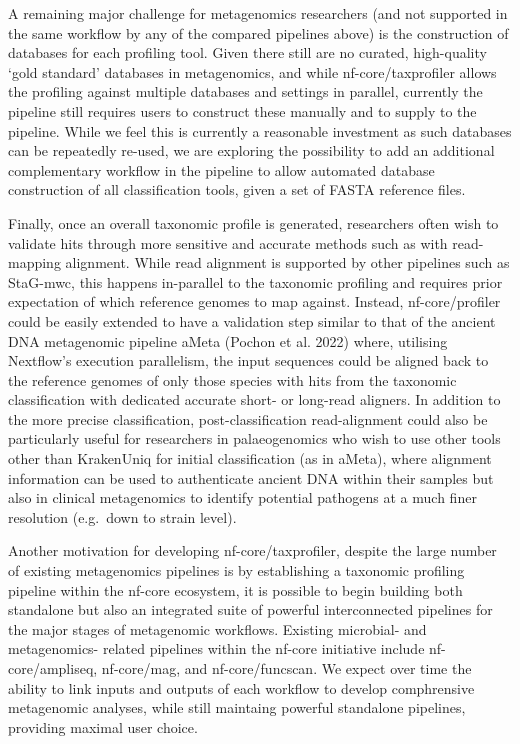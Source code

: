 \documentclass[
]{article}
\begin{document}
A remaining major challenge for metagenomics researchers (and not
supported in the same workflow by any of the compared pipelines above)
is the construction of databases for each profiling tool. Given there
still are no curated, high-quality `gold standard' databases in
metagenomics, and while nf-core/taxprofiler allows the profiling against
multiple databases and settings in parallel, currently the pipeline
still requires users to construct these manually and to supply to the
pipeline. While we feel this is currently a reasonable investment as
such databases can be repeatedly re-used, we are exploring the
possibility to add an additional complementary workflow in the pipeline
to allow automated database construction of all classification tools,
given a set of FASTA reference files.

Finally, once an overall taxonomic profile is generated, researchers
often wish to validate hits through more sensitive and accurate methods
such as with read-mapping alignment. While read alignment is supported
by other pipelines such as StaG-mwc, this happens in-parallel to the
taxonomic profiling and requires prior expectation of which reference
genomes to map against. Instead, nf-core/profiler could be easily
extended to have a validation step similar to that of the ancient DNA
metagenomic pipeline aMeta (Pochon et al. 2022) where, utilising
Nextflow's execution parallelism, the input sequences could be aligned
back to the reference genomes of only those species with hits from the
taxonomic classification with dedicated accurate short- or long-read
aligners. In addition to the more precise classification,
post-classification read-alignment could also be particularly useful for
researchers in palaeogenomics who wish to use other tools other than
KrakenUniq for initial classification (as in aMeta), where alignment
information can be used to authenticate ancient DNA within their samples
but also in clinical metagenomics to identify potential pathogens at a
much finer resolution (e.g.~down to strain level).

Another motivation for developing nf-core/taxprofiler, despite the large
number of existing metagenomics pipelines is by establishing a taxonomic
profiling pipeline within the nf-core ecosystem, it is possible to begin
building both standalone but also an integrated suite of powerful
interconnected pipelines for the major stages of metagenomic workflows.
Existing microbial- and metagenomics- related pipelines within the
nf-core initiative include nf-core/ampliseq, nf-core/mag, and
nf-core/funcscan. We expect over time the ability to link inputs and
outputs of each workflow to develop comphrensive metagenomic analyses,
while still maintaing powerful standalone pipelines, providing maximal
user choice.
\end{document}
